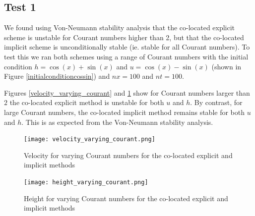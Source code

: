 \documentclass[a4paper,12pt, notitlepage]{article}
\begin{document}
\subsection{Test 1}
We found using Von-Neumann stability analysis that the co-located explicit scheme is unstable for Courant numbers higher than 2, but that the co-located implicit scheme is unconditionally stable (ie. stable for all Courant numbers). To test this we ran both schemes using a range of Courant numbers with the initial condition $h = \cos(x) + \sin(x)$ and $u = \cos(x) -\sin(x)$ (shown in Figure \ref{initialconditioncossin}) and $nx = 100$ and $nt = 100$.

Figures \ref{velocity_varying_courant} and \ref{height_varying_courant} show for Courant numbers larger than $2$ the co-located explicit method is unstable for both $u$ and $h$. By contrast, for large Courant numbers, the co-located implicit method remains stable for both $u$ and $h$. This is as expected from the Von-Neumann stability analysis.

\begin{figure}[H]
	\begin{minipage}{.5\textwidth}
		\ContinuedFloat*
		\captionsetup{width=0.9\textwidth}
		\captionsetup{justification=centering}
		\texttt{[image: velocity\_varying\_courant.png]}
		\caption{\label{velocity_varying_courant} Velocity for varying Courant numbers for the co-located explicit and implicit methods} 
	\end{minipage}
	\begin{minipage}{.5\textwidth}
	\ContinuedFloat
	\captionsetup{width=0.9\textwidth}
	\captionsetup{justification=centering}
	\texttt{[image: height\_varying\_courant.png]}
	\caption{\label{height_varying_courant} Height for varying Courant numbers for the co-located explicit and implicit methods} 
\end{minipage}
\end{figure}
\end{document}
